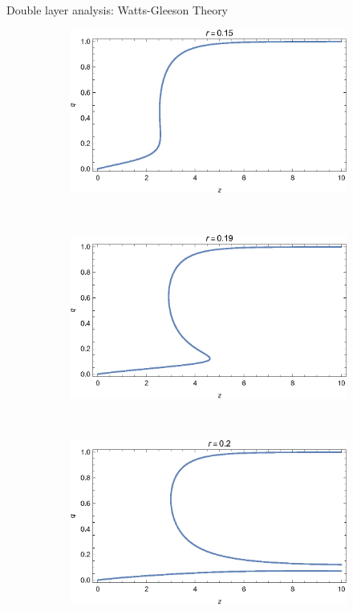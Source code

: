 \documentclass[10pt, xcolor=dvipsnames, handout]{beamer}
\begin{document}
\begin{frame}{Double layer analysis: Watts-Gleeson Theory}
\begin{figure}
    \centering
    \begin{subfigure}[b]{0.4\textwidth}
        \includegraphics[width=\textwidth]{figures/two_layer_node_qz_r015}
    \end{subfigure}
    ~ %
    \begin{subfigure}[b]{0.4\textwidth}
        \includegraphics[width=\textwidth]{figures/two_layer_node_qz_r019}
    \end{subfigure}
    ~ %
    \begin{subfigure}[b]{0.4\textwidth}
        \includegraphics[width=\textwidth]{figures/two_layer_node_qz_r02}

\end{subfigure}
\end{figure}
\end{frame}
\end{document}
